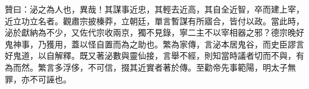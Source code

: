 \begin{pinyinscope}
 贊曰：泌之為人也，異哉！其謀事近忠，其輕去近高，其自全近智，卒而建上宰，近立功立名者。觀肅宗披榛莽，立朝廷，單言暫謀有所寤合，皆付以政。當此時，泌於獻納為不少，又佐代宗收兩京，獨不見錄，寧二主不以宰相器之邪？德宗晚好鬼神事，乃獲用，蓋以怪自置而為之助也。繁為家傳，言泌本居鬼谷，而史臣謬言好鬼道，以自解釋。既又著泌數與靈仙接，言舉不經，則知當時議者切而不與，有為而然。繁言多浮侈，不可信，掇其近實者著於傳。至勸帝先事範陽，明太子無罪，亦不可誣也。



\end{pinyinscope}